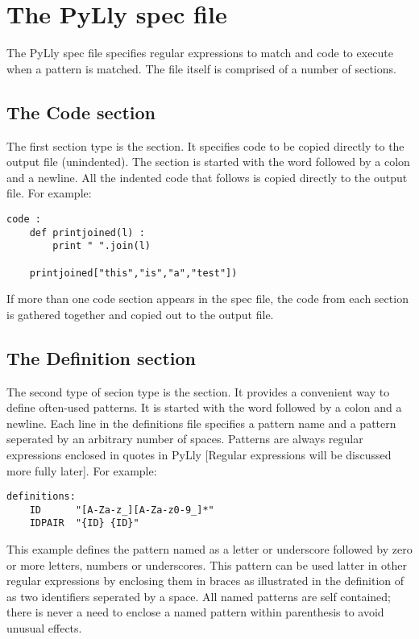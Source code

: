 \chapter{The PyLly spec file}

The PyLly spec file specifies regular expressions to match and code
to execute when a pattern is matched.   The file itself is comprised
of a number of sections. 

\section{The Code section}
The first section type is the  section.  It specifies code to
be copied directly to the output file (unindented).  The  section
is started with the word  followed by a colon and a newline.  All
the indented code that follows is copied directly to the output file.
For example:

\begin{verbatim}
code :
    def printjoined(l) :
        print " ".join(l)

    printjoined["this","is","a","test"])
\end{verbatim}

If more than one code section appears in the spec file, the code from
each section is gathered together and copied out to the output file.

\section{The Definition section}
The second type of secion type is the  section.  It provides
a convenient way to define often-used patterns.  It is started with
the word  followed by a colon and a newline.  Each line
in the definitions file specifies a pattern name and a pattern seperated
by an arbitrary number of spaces.  Patterns are always regular expressions 
enclosed in quotes in PyLly [Regular expressions will be discussed
more fully later].  For example:

\begin{verbatim}
definitions:
    ID      "[A-Za-z_][A-Za-z0-9_]*"
    IDPAIR  "{ID} {ID}"
\end{verbatim}

This example defines the pattern named  as a letter or underscore
followed by zero or more letters, numbers or underscores.  This pattern
can be used latter in other regular expressions by enclosing them in
braces as illustrated in the definition of  as two identifiers
seperated by a space.  All named patterns are self contained; there
is never a need to enclose a named pattern within parenthesis to avoid
unusual effects.

